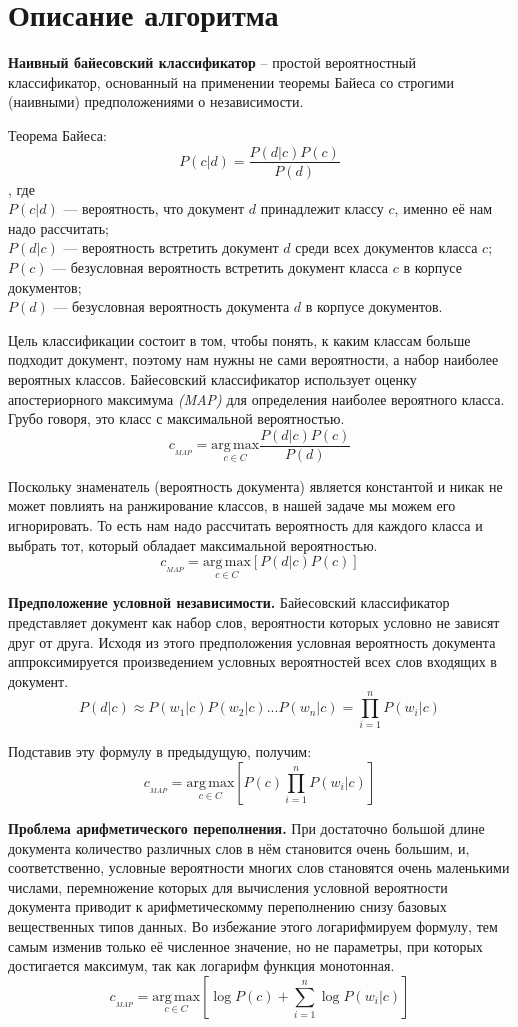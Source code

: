\section{Описание алгоритма}

\textbf{Наивный байесовский классификатор} -- простой вероятностный классификатор, основанный на применении теоремы Байеса со строгими (наивными) предположениями о независимости.

Теорема Байеса:
$$ P(c|d) = \frac{P(d|c)P(c)}{P(d)} $$ , где \\
$ P(c|d) $ — вероятность, что документ $d$ принадлежит классу $c$, именно её нам надо рассчитать; \\
$ P(d|c) $ — вероятность встретить документ $d$ среди всех документов класса $c$; \\
$ P(c) $ — безусловная вероятность встретить документ класса $c$ в корпусе документов; \\
$ P(d) $ — безусловная вероятность документа $d$ в корпусе документов.

Цель классификации состоит в том, чтобы понять, к каким классам больше подходит документ, поэтому нам нужны не сами вероятности, а набор наиболее вероятных классов. Байесовский классификатор использует оценку апостериорного максимума  \textit{(MAP)} для определения наиболее вероятного класса. Грубо говоря, это класс с максимальной вероятностью. 
$$ c_{_{MAP}} = \underset{c \in C}{\mathrm{arg\,max}} \frac{P(d|c)P(c)}{P(d)} $$

Поскольку знаменатель (вероятность документа) является константой и никак не может повлиять на ранжирование классов, в нашей задаче мы можем его игнорировать. То есть нам надо рассчитать вероятность для каждого класса и выбрать тот, который обладает максимальной вероятностью.
$$ c_{_{MAP}} = \underset{c \in C}{\mathrm{arg\,max}} \left[P(d|c)P(c)\right] $$

\textbf{Предположение условной независимости.} Байесовский классификатор представляет документ как набор слов, вероятности которых условно не зависят друг от друга. Исходя из этого предположения условная вероятность документа аппроксимируется произведением условных вероятностей всех слов входящих в документ.
$$ P(d|c) \approx P(w_1|c)P(w_2|c)...P(w_n|c) = \prod^n_{i=1}P(w_i|c) $$

Подставив эту формулу в предыдущую, получим:
$$ c_{_{MAP}} = \underset{c \in C}{\mathrm{arg\,max}} \left[P(c)\prod^n_{i=1}P(w_i|c)\right] $$

\textbf{Проблема арифметического переполнения.} При достаточно большой длине документа количество различных слов в нём становится очень большим, и, соответственно, условные вероятности многих слов становятся очень маленькими числами, перемножение которых для вычисления условной вероятности документа приводит к арифметическомму переполнению снизу базовых вещественных типов данных. Во избежание этого логарифмируем формулу, тем самым изменив только её численное значение, но не параметры, при которых достигается максимум, так как логарифм функция монотонная.
$$ c_{_{MAP}} = \underset{c \in C}{\mathrm{arg\,max}} \left[\log P(c) + \sum^n_{i=1}\log P(w_i|c)\right] $$

